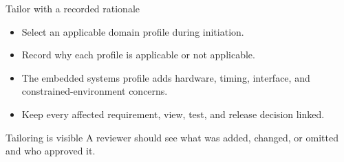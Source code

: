 \begin{frame}{Tailor with a recorded rationale}
\begin{itemize}
  \item Select an applicable domain profile during initiation.
  \item Record why each profile is applicable or not applicable.
  \item The embedded systems profile adds hardware, timing, interface, and constrained-environment concerns.
  \item Keep every affected requirement, view, test, and release decision linked.
\end{itemize}
\begin{slidecallout}{Tailoring is visible}
A reviewer should see what was added, changed, or omitted and who approved it.
\end{slidecallout}
\end{frame}
